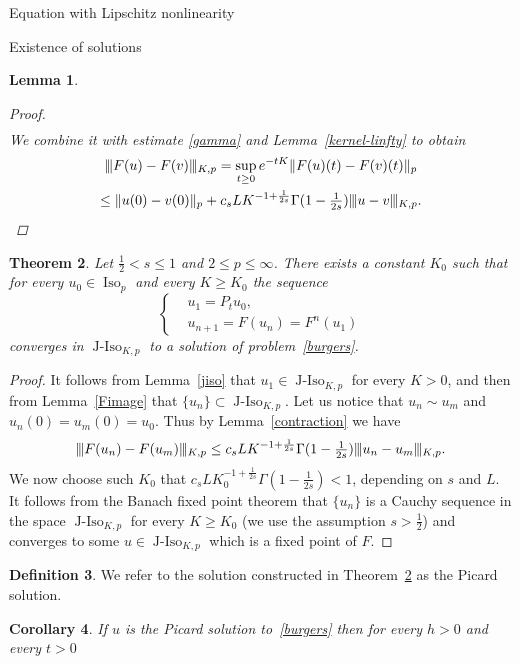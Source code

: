 \documentclass[a4paper,10pt,fleqn]{amsart}
\newtheorem{theorem}{Theorem}[section]
\newtheorem{lemma}[theorem]{Lemma}
\newtheorem{corollary}[theorem]{Corollary}
\theoremstyle{remark}
\theoremstyle{definition}
\newtheorem{definition}[theorem]{Definition}
\DeclareMathOperator{\Iso}{Iso}
\DeclareMathOperator{\JIso}{J-Iso}
\renewcommand{\=} {\overset{d}{=}}
\newcommand{\viii} {|\kern-0.25ex|\kern-0.25ex|}
\newcommand{\K}[2] {\viii #1 \viii_{K,#2}}
\begin{document}
\begin{section}{Equation with Lipschitz nonlinearity}
\begin{subsection}{Existence of solutions}
\begin{lemma}
\begin{proof}
\begin{multline*}
    \end{multline*}
    We combine it with estimate \eqref{gamma} and Lemma~\ref{kernel-linfty} to obtain
    \begin{multline*}
      \K{F(u)-F(v)}{p} = \sup_{t\geq0}e^{-tK}\|F(u)(t)-F(v)(t)\|_p \\
      \leq \|u(0)-v(0)\|_p + c_sLK^{-1+\frac{1}{2s}}\Gamma(1-\tfrac{1}{2s})\K{u-v}{p}.\qedhere
    \end{multline*}
  \end{proof}
  \end{lemma}
  \begin{theorem}\label{existence}
    Let $\frac{1}{2}<s\leq 1$ and $2\leq p\leq\infty$. There exists a constant $K_0$ such that
    for every $u_0\in\Iso_p$ and every $K\geq K_0$ the sequence 
     \begin{equation}\label{picard}
      \left\{
      \begin{aligned}
        &u_1 = P_t u_0, \\
        &u_{n+1}=F(u_{n}) = F^{n}(u_1)
      \end{aligned}
      \right.
    \end{equation}
    converges in $\JIso_{K,p}$ to a solution of problem~\eqref{burgers}.
  \end{theorem}
  \begin{proof}
  It follows from Lemma~\ref{jiso} that $u_1\in\JIso_{K,p}$ for every $K>0$,
  and then from Lemma~\ref{Fimage} that $\{u_n\}\subset\JIso_{K,p}$.
  Let us notice that $u_n\sim u_m$ and $u_n(0)=u_m(0)=u_0$.
  Thus by Lemma~\ref{contraction} we have
  \begin{equation*}
      \K{F(u_n)-F(u_m)}{p}\leq c_sLK^{-1+\frac{1}{2s}}\Gamma(1-\tfrac{1}{2s})\K{u_n-u_m}{p}.
  \end{equation*}
  We now choose such $K_0$ that $c_sLK_0^{-1+\frac{1}{2s}}\Gamma(1-\frac{1}{2s})<1$, depending on $s$ and $L$. 
  It follows from the Banach fixed point theorem that $\{u_n\}$ is a Cauchy sequence in the space
  $\JIso_{K,p}$ for every $K\geq K_0$ (we use the assumption $s>\frac{1}{2}$)
  and converges to some $u\in\JIso_{K,p}$ which is a fixed point of $F$.
  \end{proof}
\begin{definition}
 We refer to the solution constructed in Theorem~\ref{existence} as the Picard solution.
\end{definition}
  \begin{corollary}\label{uniqueness}
      If $u$ is the Picard solution to~\eqref{burgers} then for every $h>0$ and every $t>0$

\end{corollary}
\end{subsection}
\end{section}
\end{document}
